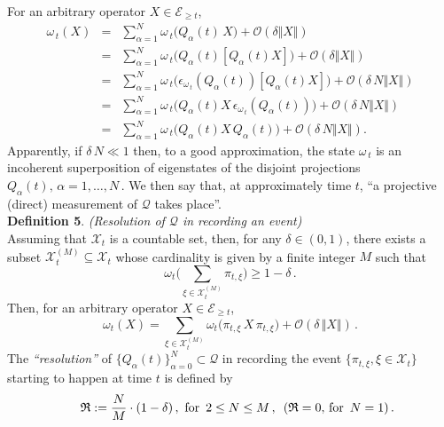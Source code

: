 \documentclass[12pt]{article}
\begin{document}
\begin{enumerate}
{For an arbitrary operator $X\in \mathcal{E}_{\geq t}$,
\begin{eqnarray}\label{superpos}
\omega_{\,t}(X)&=& \sum_{\alpha=1}^{N} \omega_{\,t} \big(Q_{\alpha}(t)\,X\big) + \mathcal{O}(\delta \Vert X \Vert) \nonumber\\
&=& \sum_{\alpha=1}^{N} \omega_{\,t}\big(Q_{\alpha}(t)[Q_{\alpha}(t) X]\big) + \mathcal{O}(\delta \Vert X \Vert) \nonumber\\
&=& \sum_{\alpha=1}^{N} \omega_{\,t}\big(\epsilon_{\omega_{\,t}}(Q_{\alpha}(t))[Q_{\alpha}(t) X]\big) + \mathcal{O}(\delta \,N \Vert X \Vert) \nonumber \\
\quad &=& \sum_{\alpha=1}^{N} \omega_{\,t}\big(Q_{\alpha}(t) X\, \epsilon_{\omega_{\,t}}(Q_{\alpha}(t))\big) + \mathcal{O}(\delta \,N \Vert X \Vert) \nonumber\\
&=&  \sum_{\alpha=1}^{N} \omega_{\,t}\big(Q_{\alpha}(t) X\,Q_{\alpha}(t)\big) + \mathcal{O}(\delta \,N \Vert X \Vert).
\end{eqnarray}
Apparently, if $\delta \, N\ll 1$ then, to a good approximation, the state $\omega_{\,t}$ is an incoherent superposition of eigenstates of the disjoint projections $Q_{\alpha}(t), \, \alpha = 1,\dots, N$\,. We then say that, at approximately time $t$, ``a projective (direct) measurement of $\mathcal{Q}$ takes place''.\\

{\bf{Definition 5}}. \textit{(Resolution of $\mathcal{Q}$ in recording an event)}\\
Assuming that $\mathcal{X}_{t}$ is a countable set, then, for any $\delta \in (0,1)$, there exists a subset $\mathcal{X}_{t}^{(M)} \subseteq \mathcal{X}_t$ whose cardinality is given by a finite integer $M$ such that 
$$\omega_{t}\Big( \sum_{\xi \in \mathcal{X}_{t}^{(M)}} \pi_{t, \xi} \Big) \geq 1-\delta\,.$$
Then, for an arbitrary operator $X\in \mathcal{E}_{\geq t}$,
$$\omega_{t}(X)= \sum_{\xi \in \mathcal{X}_{t}^{(M)}} \omega_{t} \big(\pi_{t,\xi}\,X\, \pi_{t,\xi} \big) + \mathcal{O}(\delta\,\Vert X \Vert)\,.$$
The \textit{``resolution''} of $\lbrace Q_{\alpha}(t) \rbrace_{\alpha=0}^{N} \subset \mathcal{Q}$ in recording the event \mbox{$\lbrace \pi_{t,\xi}, \xi \in \mathcal{X}_{t} \rbrace$} starting to happen at time $t$ is defined by
\begin{equation}\label{resolution}
\hspace{1cm} \mathfrak{R}:= \frac{N}{M}\cdot(1-\delta) \,, \,\,\text{for  }\, 2\leq N \leq M\,,\,\,\, (\mathfrak{R}=0, \, \text{for   }\, N=1)\,. \hspace{0.6cm} \square
\end{equation}

}
\end{enumerate}
\end{document}
